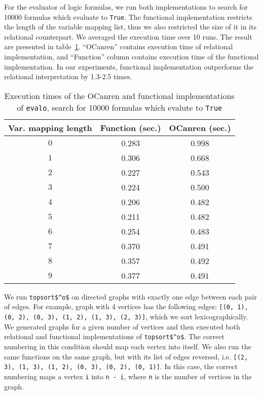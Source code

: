 For the evaluator of logic formulas, we run both implementations to search for 10000 formulas which evaluate to \lstinline{True}.
The functional implementation restricts the length of the variable mapping list, thus we also restricted the size of it in its relational counterpart.
We averaged the execution time over 10 runs.
The result are presented in table~\ref{tbl:prop}.
``OCanren'' contains execution time of relational implementation, and ``Function'' column contains execution time of the functional implementation.
In our experiments, functional implementation outperforms the relational interpretation by 1.3-2.5 times.


\begin{table}
  \caption{Execution times of the OCanren and functional implementations of \lstinline{evalo}, search for 10000 formulas which evalute to \lstinline{True}}
  \label{tbl:prop}
  \begin{tabular}{ccc}
    \toprule
    Var. mapping length&Function (sec.)&OCanren (sec.)\\
    \midrule
    $0$ & 0.283 & 0.998 \\
    $1$ & 0.306 & 0.668 \\
    $2$ & 0.227 & 0.543 \\
    $3$ & 0.224 & 0.500 \\
    $4$ & 0.206 & 0.482 \\
    $5$ & 0.211 & 0.482 \\
    $6$ & 0.254 & 0.483 \\
    $7$ & 0.370 & 0.491 \\
    $8$ & 0.357 & 0.492 \\
    $9$ & 0.377 & 0.491 \\
  \bottomrule
\end{tabular}
\end{table}

We run \lstinline{topsort$^o$} on directed graphs with exactly one edge between each pair of edges.
For example, graph with 4 vertices has the following edges: \lstinline{[(0, 1), (0, 2), (0, 3), (1, 2), (1, 3), (2, 3)]}, which we sort lexicographically.
We generated graphs for a given number of vertices and then executed both relational and functional implementations of \lstinline{topsort$^o$}.
The correct numbering in this condition should map each vertex into itself.
We also run the same functions on the same graph, but with its list of edges reversed, i.e. \lstinline{[(2, 3), (1, 3), (1, 2), (0, 3), (0, 2), (0, 1)]}.
In this case, the correct numbering maps a vertex \lstinline{i} into \lstinline{n - i}, where \lstinline{n} is the number of vertices in the graph.

